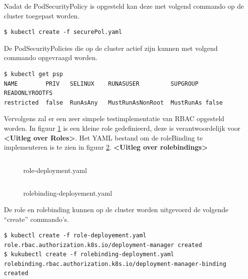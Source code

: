 Nadat de PodSecurityPolicy is opgesteld kan deze met volgend commando op de cluster toegepast worden.
\begin{verbatim} 
$ kubectl create -f securePol.yaml
\end{verbatim}

De PodSecurityPolicies die op de cluster actief zijn kunnen met volgend commando opgevraagd worden.

\begin{verbatim} 
$ kubectl get psp
NAME        PRIV   SELINUX    RUNASUSER         SUPGROUP  READONLYROOTFS   
restricted  false  RunAsAny   MustRunAsNonRoot  MustRunAs false          
\end{verbatim}


Vervolgens zal er een zeer simpele testimplementatie van RBAC opgesteld worden. In figuur \ref{roleDeploy} is een kleine role gedefinieerd, deze is verantwoordelijk voor \textbf{<Uitleg over Roles>}. Het YAML bestand om de roleBinding te implementeren is te zien in figuur \ref{roleBindDeploy}. \textbf{<Uitleg over rolebindings>}
\begin{figure}[h] 
	\centering
	\inputminted[fontsize=\footnotesize,linenos]{yaml}{files/role-deployment.yaml}
	\caption{role-deployment.yaml}
	\label{roleDeploy}
\end{figure}

\begin{figure}[h] 
	\centering
	\inputminted[fontsize=\footnotesize,linenos]{yaml}{files/rolebinding-deployment.yaml}
	\caption{rolebinding-deployement.yaml}
	\label{roleBindDeploy}
\end{figure}

De role en rolebinding kunnen op de cluster worden uitgevoerd de volgende ``create'' commando's.

\begin{verbatim} 
$ kubectl create -f role-deployement.yaml
role.rbac.authorization.k8s.io/deployment-manager created
$ kukubectl create -f rolebinding-deployment.yaml
rolebinding.rbac.authorization.k8s.io/deployment-manager-binding created
\end{verbatim}




